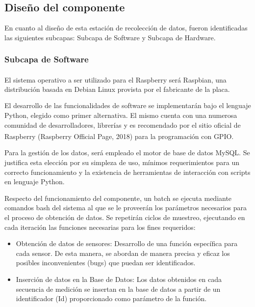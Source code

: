             
    \subsection{Diseño del componente}
            \par En cuanto al diseño de esta estación de recolección de datos, fueron identificadas las siguientes subcapas: Subcapa de Software y Subcapa de Hardware.
            
            \subsubsection{Subcapa de Software}
                \par El sistema operativo a ser utilizado para el Raspberry\textsuperscript{\textregistered} será Raspbian, una distribución basada en Debian Linux provista por el fabricante de la placa.
                
               \par El desarrollo de las funcionalidades de software se implementarán bajo el lenguaje Python, elegido como primer alternativa. El mismo cuenta con una numerosa comunidad de desarrolladores, librerías y es recomendado por el sitio oficial de Raspberry\textsuperscript{\textregistered} (Raspberry\textsuperscript{\textregistered} Official Page, 2018) para la programación con GPIO.
                
                \par Para la gestión de los datos, será empleado el motor de base de datos MySQL. Se justifica esta elección por su simpleza de uso, mínimos requerimientos para un correcto funcionamiento y la existencia de herramientas de interacción con scripts en lenguaje Python.
                
                \par Respecto del funcionamiento del componente, un batch se ejecuta mediante comandos bash del sistema al que se le proveerán los parámetros necesarios para el proceso de obtención de datos. Se repetirán ciclos de muestreo, ejecutando en cada iteración las funciones necesarias para los fines requeridos:
                    
                    \begin{itemize}
                        \item Obtención de datos de sensores: Desarrollo de una función específica para cada sensor. De esta manera, se abordan de manera precisa y eficaz los posibles inconvenientes (bugs) que puedan ser identificados.
                        
                        \item Inserción de datos en la Base de Datos: Los datos obtenidos en cada secuencia de medición se insertan en la base de datos a partir de un identificador (Id) proporcionado como parámetro de la función.
                    \end{itemize}
                
